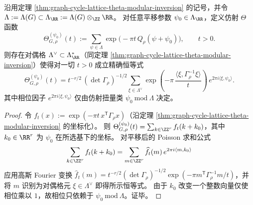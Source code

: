 \begin{corollary}\label{cor:graph-cycle-affine-torsor-theta-poisson-phase}
沿用定理 \ref{thm:graph-cycle-lattice-theta-modular-inversion} 的记号，并令 \(\Lambda:=\Lambda(G)\subset\Lambda_{\RR}:=\Lambda(G)\otimes_{\ZZ}\RR\)。
对任意平移参数 \(\psi_0\in\Lambda_{\RR}\)，定义仿射 \(\Theta\) 函数
\[
\Theta_{G,\rho}^{(\psi_0)}(t):=\sum_{\psi\in\Lambda}\exp\!\bigl(-\pi t\,Q_\rho(\psi+\psi_0)\bigr),
\qquad t>0.
\]
则存在对偶格 \(\Lambda^\vee\subset \Lambda_{\RR}^\ast\)（同定理 \ref{thm:graph-cycle-lattice-theta-modular-inversion}）使得对一切 \(t>0\) 成立精确恒等式
\[
\boxed{\;
\Theta_{G,\rho}^{(\psi_0)}(t)
=t^{-r/2}\,(\det\Gamma_\rho)^{-1/2}
\sum_{\xi\in \Lambda^\vee}\exp\!\left(-\pi\,\frac{\langle\xi,\Gamma_\rho^{-1}\xi\rangle}{t}\right)\,
e^{2\pi i\langle\xi,\psi_0\rangle}.
\;}
\]
其中相位因子 \(e^{2\pi i\langle\xi,\psi_0\rangle}\) 仅由仿射扭量类 \(\psi_0\ \mathrm{mod}\ \Lambda\) 决定。
\end{corollary}
\begin{proof}
令 \(f_t(x):=\exp(-\pi t\,x^{\mathsf T}\Gamma_\rho x)\)（沿定理 \ref{thm:graph-cycle-lattice-theta-modular-inversion} 的坐标化）。
则
\(
\Theta_{G,\rho}^{(\psi_0)}(t)=\sum_{k\in\ZZ^r} f_t(k+k_0)
\)，其中 \(k_0\in\RR^r\) 为 \(\psi_0\) 在所选基下的坐标。
对平移后的 Poisson 求和公式
\[
\sum_{k\in\ZZ^r} f_t(k+k_0)=\sum_{m\in\ZZ^r}\widehat f_t(m)\,e^{2\pi i\langle m,k_0\rangle}
\]
应用高斯 Fourier 变换 \(\widehat f_t(m)=t^{-r/2}(\det\Gamma_\rho)^{-1/2}\exp(-\pi m^{\mathsf T}\Gamma_\rho^{-1}m/t)\)，并将 \(m\) 识别为对偶格元 \(\xi\in\Lambda^\vee\) 即得所示恒等式。
由于 \(k_0\) 改变一个整数向量仅使相位乘以 \(1\)，故相位只依赖于 \(\psi_0\ \mathrm{mod}\ \Lambda\)。证毕。
\end{proof}

\endinput
